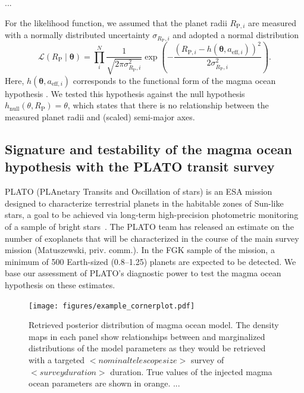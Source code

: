 \documentclass[modern]{aastex631}
\begin{document}
\begin{note}
\end{note}
...

For the likelihood function, we assumed that the planet radii $R_{\mathrm{P}, i}$ are measured with a normally distributed uncertainty $\sigma_{R_\mathrm{P}, i}$ and adopted a normal distribution
\begin{equation}
    \mathcal{L}(R_\mathrm{P} \mid \boldsymbol{\theta})=\prod_{i}^{N} \frac{1}{\sqrt{2 \pi \sigma_{R_\mathrm{P}, i}^{2}}} \exp \left(-\frac{\left(R_{\mathrm{P}, i}-h\left(\boldsymbol{\theta}, a_{\mathrm{eff}, i}\right)\right)^{2}}{2 \sigma_{R_\mathrm{P}, i}^{2}}\right).
\end{equation}
Here, $h\left(\boldsymbol{\theta}, a_{\mathrm{eff}, i}\right)$ corresponds to the functional form of the magma ocean hypothesis .
We tested this hypothesis against the null hypothesis $h_\mathrm{null} (\theta, R_\mathrm{P}) = \theta$, which states that there is no relationship between the measured planet radii and (scaled) semi-major axes.

\subsection{Signature and testability of the magma ocean hypothesis with the PLATO transit survey}
PLATO (PLAnetary Transits and Oscillation of stars) is an ESA mission designed to characterize terrestrial planets in the habitable zones of Sun-like stars, a goal to be achieved via long-term high-precision photometric monitoring of a sample of bright stars~\citep{Rauer2016}.
The PLATO team has released an estimate on the number of exoplanets that will be characterized in the course of the main survey mission (Matuszewski, priv. comm.).
In the FGK sample of the mission, a minimum of 500 Earth-sized (\SIrange{0.8}{1.25}{\rEarth}) planets are expected to be detected.
We base our assessment of PLATO's diagnostic power to test the magma ocean hypothesis on these estimates.

\begin{figure}[ht!]
    \begin{centering}
        \texttt{[image: figures/example\_cornerplot.pdf]}
        \caption{
        Retrieved posterior distribution of magma ocean model. The density maps in each panel show relationships between and marginalized distributions of the model parameters as they would be retrieved with a targeted $<nominal telescope size>$ survey of $<survey duration>$ duration. True values of the injected magma ocean parameters are shown in orange. ...
        }
        \label{fig:cornerplot}
    \end{centering}
\end{figure}
\end{document}

